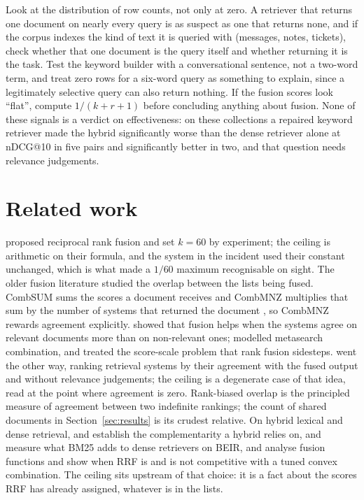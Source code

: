 \documentclass[11pt]{article}
\begin{document}
Look at the distribution of row counts, not only at zero. A retriever that returns one document on nearly every query is as suspect as one that returns none, and if the corpus indexes the kind of text it is queried with (messages, notes, tickets), check whether that one document is the query itself and whether returning it is the task. Test the keyword builder with a conversational sentence, not a two-word term, and treat zero rows for a six-word query as something to explain, since a legitimately selective query can also return nothing. If the fusion scores look ``flat'', compute $1/(k+r+1)$ before concluding anything about fusion. None of these signals is a verdict on effectiveness: on these collections a repaired keyword retriever made the hybrid significantly worse than the dense retriever alone at nDCG@10 in five pairs and significantly better in two, and that question needs relevance judgements.

\section{Related work}
\label{sec:related}

\citet{cormack2009rrf} proposed reciprocal rank fusion and set $k = 60$ by experiment; the ceiling is arithmetic on their formula, and the system in the incident used their constant unchanged, which is what made a $1/60$ maximum recognisable on sight. The older fusion literature studied the overlap between the lists being fused. CombSUM sums the scores a document receives and CombMNZ multiplies that sum by the number of systems that returned the document \citep{fox1994combination}, so CombMNZ rewards agreement explicitly. \citet{lee1997analyses} showed that fusion helps when the systems agree on relevant documents more than on non-relevant ones; \citet{aslam2001metasearch} modelled metasearch combination, and \citet{montague2001normalization} treated the score-scale problem that rank fusion sidesteps. \citet{nuray2006ranking} went the other way, ranking retrieval systems by their agreement with the fused output and without relevance judgements; the ceiling is a degenerate case of that idea, read at the point where agreement is zero. Rank-biased overlap \citep{webber2010rbo} is the principled measure of agreement between two indefinite rankings; the count of shared documents in Section~\ref{sec:results} is its crudest relative. On hybrid lexical and dense retrieval, \citet{luan2021sparse} and \citet{gao2021clear} establish the complementarity a hybrid relies on, \citet{wang2021interpolation} and \citet{chen2022hybrid} measure what BM25 adds to dense retrievers on BEIR, and \citet{bruch2023fusion} analyse fusion functions and show when RRF is and is not competitive with a tuned convex combination. The ceiling sits upstream of that choice: it is a fact about the scores RRF has already assigned, whatever is in the lists.
\end{document}
